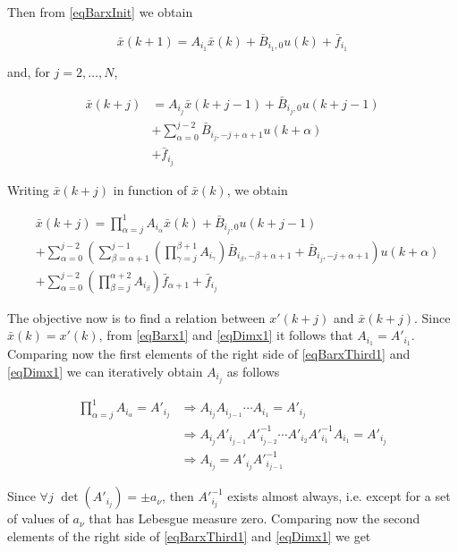 \documentclass[letterpaper, 10 pt, conference]{ifacconf}  %
\begin{document}
\begin{pf}
	Then from \eqref{eqBarxInit} we obtain
	
	\small
	\begin{equation}\label{eqBarx1}
	\bar x(k+1) = A_{i_1}\bar x(k) + \bar B_{i_1,0}u(k) + \bar f_{i_1}
	\end{equation}
	\normalsize
	
	and, for $j=2,\ldots,N$,
	
	\small
	\begin{align}\label{eqBarxSecond}
	\bar x(k+j) &= A_{i_j}\bar x(k+j-1) + \bar B_{i_j,0}u(k+j-1)  \\
	&+ \sum_{\alpha=0}^{j-2}\bar B_{i_j,-j+\alpha+1}u(k+\alpha) \\
	&+ \bar f_{i_j}
	\end{align}
	\normalsize
	
	Writing $\bar x(k+j)$ in function of $\bar x(k)$, we obtain
	
	\small
	\begin{align}
	&\bar x(k+j) = \prod_{\alpha=j}^{1}{A_{i_\alpha}}\bar x(k) + \bar B_{i_j,0}u(k+j-1)\label{eqBarxThird1}\\
	&+ \sum_{\alpha=0}^{j-2}{\left(\sum_{\beta=\alpha+1}^{j-1}{\left(\prod_{\gamma=j}^{\beta+1}{A_{i_\gamma}}\right)\bar B_{i_{\beta},-\beta+\alpha+1} + \bar B_{i_j,-j+\alpha+1}}\right)u(k+\alpha)}\label{eqBarxThird2}	\\	
	&+ \sum_{\alpha=0}^{j-2}{\left(\prod_{\beta=j}^{\alpha + 2}{A_{i_\beta}}\right)\bar f_{\alpha+1}} + \bar f_{i_j}\label{eqBarxThird3}		
	\end{align}
	\normalsize
	
	The objective now is to find a relation between $x'(k+j)$ and $\bar x(k+j)$. Since $\bar x(k)=x'(k)$, from \eqref{eqBarx1} and \eqref{eqDimx1} it follows that $A_{i_1}=A'_{i_1}$. Comparing now the first elements of the right side of \eqref{eqBarxThird1} and \eqref{eqDimx1} we can iteratively obtain $A_{i_j}$ as follows
	
	\small
	\begin{align}\label{eqAij}
	\nonumber\prod_{\alpha=j}^{1}{A_{i_\alpha}}=A'_{i_j}&\Rightarrow A_{i_j}A_{i_{j-1}}\cdots A_{i_1}=A'_{i_j}\\
	\nonumber&\Rightarrow A_{i_j}A'_{i_{j-1}}A'^{-1}_{i_{j-2}}\cdots A'_{i_2}A'^{-1}_{i_1}A_{i_1}=A'_{i_j}\\
	&\Rightarrow A_{i_j}=A'_{i_j}A'^{-1}_{i_{j-1}}
	\end{align}
	\normalsize
	
	Since $\forall j$ $\det(A'_{i_j}) = \pm a_\nu$, then $A'^{-1}_{i_j}$ exists almost always, i.e. except for a set of values of $a_\nu$ that has Lebesgue measure zero. 
	Comparing now the second elements of the right side of \eqref{eqBarxThird1} and \eqref{eqDimx1} we get


\end{pf}
\end{document}

